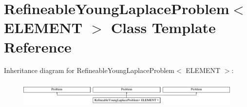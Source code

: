 \hypertarget{classRefineableYoungLaplaceProblem}{}\section{Refineable\+Young\+Laplace\+Problem$<$ E\+L\+E\+M\+E\+NT $>$ Class Template Reference}
\label{classRefineableYoungLaplaceProblem}
Inheritance diagram for Refineable\+Young\+Laplace\+Problem$<$ E\+L\+E\+M\+E\+NT $>$\+:\begin{figure}[H]
\begin{center}
\leavevmode
\includegraphics[height=1.287356cm]{classRefineableYoungLaplaceProblem}
\end{center}
\end{figure}
